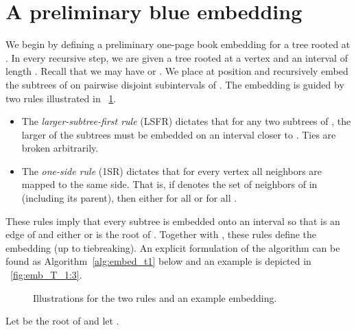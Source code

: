 \documentclass[11pt,a4paper,colorlinks=true,urlcolor=blue,citecolor=red]{article}
\theoremstyle{plain}
\begin{document}
\section{A preliminary blue embedding}\label{sec:emb_t1}
We begin by defining a preliminary one-page book embedding
 for a tree  rooted at .
In every recursive step, we are given a tree  rooted at a vertex 
and an interval  of length . Recall that we may have 
or . We place  at position  and recursively embed the
subtrees of  on pairwise disjoint subintervals of
. The embedding is guided by two rules illustrated
in \figurename~\ref{fig:emb_T_1}.
\begin{itemize}
\item The \emph{larger-subtree-first rule} (LSFR) dictates that for any
  two subtrees of , the larger of the subtrees must be embedded on an
  interval closer to . Ties are broken arbitrarily.
\item The \emph{one-side rule} (1SR) dictates that for every vertex
all neighbors are mapped to the same side. That is, if  denotes the set of neighbors of  in 
  (including its parent), then either  for all
   or  for all .
\end{itemize}
These rules imply that every subtree  is embedded onto
an interval  so that  is an edge of 
and either  or  is the root of . Together with ,
these rules define the embedding (up to tiebreaking). An explicit
formulation of the algorithm can be found as
Algorithm~\ref{alg:embed_t1} below and an example is depicted in
\figurename~\ref{fig:emb_T_1:3}.
\begin{figure}[htbp]
  \centering {}\hfil \subfloat[1SR]{\texttt{[image: 1sr]}\label{fig:emb_T_1:2}}\hfil {}\caption{Illustrations for the two rules and an example embedding.\label{fig:emb_T_1}}
\end{figure}


\begin{algorithm}[H] \label{alg:embed_t1}\newcommand{\alet}{\leftarrow}\newcommand{\id}[1]{\mathit{#1}}\DontPrintSemicolon {}

  Let  be the root of  and let .\;\;
  \caption{.}
\end{algorithm}
\end{document}
